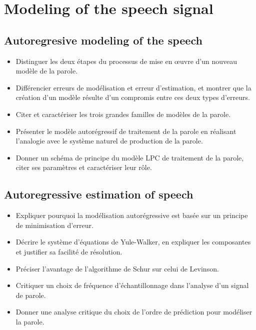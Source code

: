 \documentclass[letterpaper, 12pt]{article}
\begin{document}
\section{Modeling of the speech signal}
	\subsection{Autoregresive modeling of the speech}
		\begin{itemize}
			\setlength{\itemsep}{0pt}		
			\setlength{\parskip}{0pt}		
			\setlength{\parsep}{0pt}	
			\item Distinguer les deux étapes du processus de mise en œuvre d'un nouveau modèle de la parole.
    		\item Différencier erreurs de modélisation et erreur d'estimation, et montrer que la création d'un modèle 
    			résulte d'un compromis entre ces deux types d'erreurs.
    		\item Citer et caractériser les trois grandes familles de modèles de la parole.
    		\item Présenter le modèle autorégressif de traitement de la parole en réalisant l'analogie avec le système 
    			naturel de production de la parole.
    		\item Donner un schéma de principe du modèle LPC de traitement de la parole, citer ses paramètres et 
    			caractériser leur rôle.
		\end{itemize}
	\subsection{Autoregressive estimation of speech}
		\begin{itemize}
			\setlength{\itemsep}{0pt}		
			\setlength{\parskip}{0pt}		
			\setlength{\parsep}{0pt}	
			\item Expliquer pourquoi la modélisation autorégressive est basée sur un principe de minimisation 
				d'erreur.
		    \item Décrire le système d'équations de Yule-Walker, en expliquer les composantes et justifier sa facilité 
		    	de résolution.
    		\item Préciser l'avantage de l'algorithme de Schur sur celui de Levinson.
		    \item Critiquer un choix de fréquence d'échantillonnage dans l'analyse d'un signal de parole.
    		\item Donner une analyse critique du choix de l'ordre de prédiction pour modéliser la parole.
		\end{itemize}
\end{document}
